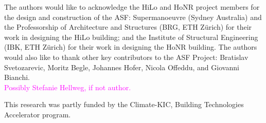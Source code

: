 
The authors would like to acknowledge the HiLo and HoNR project members for the design and construction of the ASF: Supermanoeuvre (Sydney Australia) and the Professorship of Architecture and Structures (BRG, ETH Zürich) for their work in designing the HiLo building; and the Institute of Structural Engineering (IBK, ETH Zürich) for their work in designing the HoNR building. The authors would also like to thank other key contributors to the ASF Project: Bratislav Svetozarevic, Moritz Begle, Johannes Hofer, Nicola Offeddu, and Giovanni Bianchi. \\
\textcolor{magenta}{Possibly Stefanie Hellweg, if not author.}

This research was partly funded by the Climate-KIC, Building Technologies Accelerator program.
